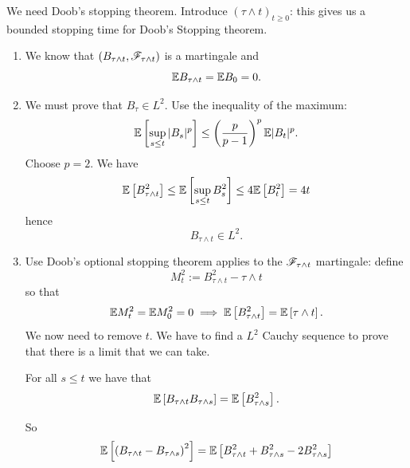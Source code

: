 \documentclass[12pt]{report}
\begin{document}
	\begin{fancyproof}
		We need Doob's stopping theorem. Introduce ${(\tau\wedge t)}_{t\geq0}$: this gives us a bounded stopping time for Doob's Stopping theorem. 
		\begin{enumerate}
			\item We know that $(B_{\tau\wedge t},\mathscr{F}_{\tau\wedge t})$ is a martingale and
			\begin{equation*}
				\mathbb{E} B_{\tau\wedge t}=\mathbb{E} B_{0}=0.
			\end{equation*}
			\item We must prove that $B_{\tau}\in L^{2}$. Use the inequality of the maximum:
			\begin{equation*}
				\mathbb{E}\left[\sup_{s\leq t}|B_{s}|^{p}\right]\leq\left(\frac{p}{p-1}\right)^{p}\mathbb{E}|B_{t}|^{p}.
			\end{equation*}
			Choose $p=2$. We have
			\begin{equation*}
				\mathbb{E}\left[B^{2}_{\tau\wedge t}\right]\leq\mathbb{E}\left[\sup_{s\leq t}B^{2}_{s}\right]\leq 4\mathbb{E}\left[B^{2}_{t}\right]=4t
			\end{equation*}
			hence
			\begin{equation*}
				B_{\tau\wedge t}\in L^{2}.
			\end{equation*}
			\item Use Doob's optional stopping theorem applies to the $\mathscr{F}_{\tau\wedge t}$ martingale: define
			\begin{equation*}
				M^{2}_{t}:=B^{2}_{\tau\wedge t}-\tau\wedge t
			\end{equation*}
			so that 
			\begin{equation*}
				\mathbb{E} M^{2}_{t}=\mathbb{E} M^{2}_{0}=0\implies \mathbb{E}\left[B^{2}_{\tau\wedge t}\right]=\mathbb{E}\left[\tau\wedge t\right].
			\end{equation*}
			We now need to remove $t$. We have to find a $L^{2}$ Cauchy sequence to prove that there is a limit that we can take.
			\begin{remark}
				For all $s\leq t$ we have that
				\begin{equation*}
					\mathbb{E}\left[B_{\tau\wedge t}B_{\tau\wedge s}\right]=\mathbb{E}\left[B^{2}_{\tau\wedge s}\right].
				\end{equation*}
			\end{remark}
			So
			\begin{align*}
				\evs\left[\left(B_{\tau\wedge t}-B_{\tau\wedge s}\right)^{2}\right]&=\evs\left[B^{2}_{\tau\wedge t}+B^{2}_{\tau\wedge s}-2B^{2}_{\tau\wedge s}\right]\\

\end{align*}
\end{enumerate}
\end{fancyproof}
\end{document}
